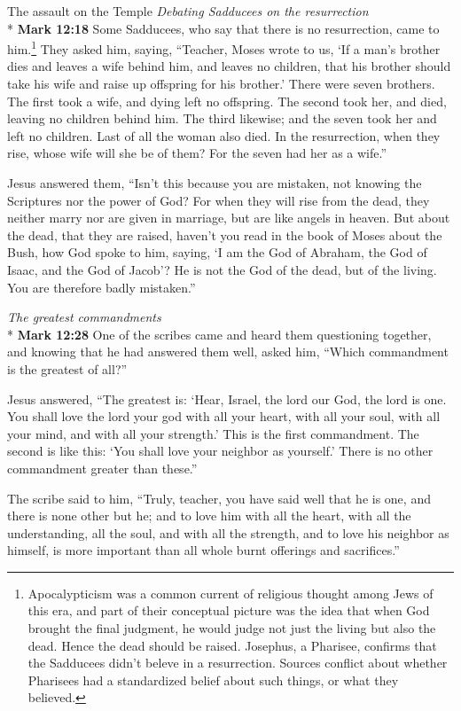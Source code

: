 \documentclass[10pt,a5paper,twoside]{article}
\newcommand{\quotesize}{\normalsize{}}
\newenvironment{quotetext}{\begingroup\quotesize}{\endgroup}
\newcommand{\intex}[1]{\index[texts]{#1}}
\newcommand{\bible}[2]{\begin{quotetext}\textbf{#1}\intex{#1} #2\end{quotetext}}
\newcommand{\gospelmark}[2]{\bible{Mark #1}{#2}}
\newcommand{\subhead}[1]{\emph{#1}\\*}
\begin{document}
\begin{section}{The assault on the Temple}
\subhead{Debating Sadducees on the resurrection}
\gospelmark{12:18}{
Some Sadducees, who say that there is no resurrection, came to him.\footnote{Apocalypticism was a common
current of religious thought among Jews of this era, and part of their conceptual picture was the idea that
when God brought the final judgment, he would judge not just the living but also the dead. Hence the dead
should be raised. Josephus, a Pharisee, confirms that the Sadducees didn't beleve in a resurrection. Sources conflict about
whether Pharisees had a standardized belief about such things, or what they believed.} They asked him, saying,   ``Teacher, Moses wrote to us, `If a man's brother dies and leaves a wife behind him, and leaves no children, that his brother should take his wife and raise up offspring for his brother.'   There were seven brothers. The first took a wife, and dying left no offspring.   The second took her, and died, leaving no children behind him. The third likewise;   and the seven took her and left no children. Last of all the woman also died.   In the resurrection, when they rise, whose wife will she be of them? For the seven had her as a wife.''

  Jesus answered them, ``Isn't this because you are mistaken, not knowing the Scriptures nor the power of God?    For when they will rise from the dead, they neither marry nor are given in marriage, but are like angels in heaven.    But about the dead, that they are raised, haven't you read in the book of Moses about the Bush, how God spoke to him, saying, `I am the God of Abraham, the God of Isaac, and the God of Jacob'?    He is not the God of the dead, but of the living. You are therefore badly mistaken.'' 
}

\subhead{The greatest commandments}\label{greatest-commandments}
\gospelmark{12:28}{
One of the scribes came and heard them questioning together, and knowing that he had answered them well, asked him, ``Which commandment is the greatest of all?''

  Jesus answered, ``The greatest is: `Hear, Israel, the lord our God, the lord is one.    You shall love the lord your god with all your heart, with all your soul, with all your mind, and with all your strength.' This is the first commandment.    The second is like this: `You shall love your neighbor as yourself.' There is no other commandment greater than these.''

  The scribe said to him, ``Truly, teacher, you have said well that he is one, and there is none other but he;   and to love him with all the heart, with all the understanding, all the soul, and with all the strength, and to love his neighbor as himself, is more important than all whole burnt offerings and sacrifices.''

}
\end{section}
\end{document}
